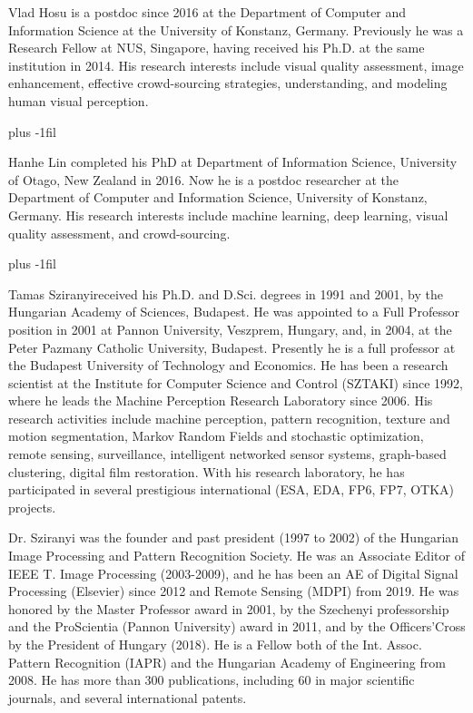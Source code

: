 \documentclass[10pt,journal,compsoc]{IEEEtran}
\begin{document}
\clearpage
\begin{IEEEbiography}{Vlad Hosu} is a postdoc since 2016 at the Department of Computer and Information Science at the University of Konstanz, Germany. Previously he was a Research Fellow at NUS, Singapore, having received his Ph.D. at the same institution in 2014. His research interests include visual quality assessment, image enhancement, effective crowd-sourcing strategies, understanding, and modeling human visual perception.
\end{IEEEbiography}
\vskip 0pt plus -1fil
\begin{IEEEbiography}{Hanhe Lin} completed his PhD at Department of Information Science, University of Otago, New Zealand in 2016. Now he is a postdoc researcher at the Department of Computer and Information Science, University of Konstanz, Germany. His research interests include machine learning, deep learning, visual quality assessment, and crowd-sourcing.
\end{IEEEbiography}
\vskip 0pt plus -1fil
\begin{IEEEbiography}{Tamas Sziranyi}received his  Ph.D. and D.Sci. degrees in 1991 and 2001, by the Hungarian Academy of Sciences, Budapest. He was appointed to a Full Professor position in 2001 at Pannon University, Veszprem, Hungary, and, in 2004, at the Peter Pazmany Catholic University, Budapest. Presently he is a full professor at the Budapest University of Technology and Economics. He has been a research scientist at the Institute for Computer Science and Control (SZTAKI) since 1992, where he leads the Machine Perception Research Laboratory since 2006. His research activities include machine perception, pattern recognition, texture and motion segmentation, Markov Random Fields and stochastic optimization, remote sensing, surveillance, intelligent networked sensor systems, graph-based clustering, digital film restoration.  With his research laboratory, he has participated in several prestigious international (ESA, EDA, FP6, FP7, OTKA) projects.

Dr. Sziranyi was the founder and past president (1997 to 2002) of the Hungarian Image Processing and Pattern Recognition Society. He was an Associate Editor of IEEE T. Image Processing (2003-2009),  and he has been an AE of Digital Signal Processing (Elsevier) since 2012 and Remote Sensing (MDPI) from 2019. He was honored by the Master Professor award in 2001, by the Szechenyi professorship and the ProScientia (Pannon University) award in 2011, and by the Officers’Cross by the President of Hungary (2018). He is a Fellow both of the Int. Assoc. Pattern Recognition (IAPR) and the Hungarian Academy of Engineering from 2008. He has more than 300 publications, including 60 in major scientific journals, and several international patents. 
\end{IEEEbiography}
\end{document}
